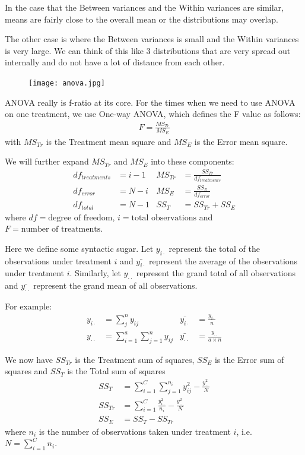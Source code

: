\documentclass[a4paper]{article}
\numberwithin{equation}{section}
\begin{document}
In the case that the Between variances and the Within variances are similar, means are fairly close to the overall mean or the distributions may overlap.

The other case is where the Between variances is small and the Within variances is very large.
We can think of this like 3 distributions that are very spread out internally and do not have a lot of distance from each other.
\begin{figure}[H]
  \centering
  \texttt{[image: anova.jpg]}
\end{figure}

ANOVA really is f-ratio at its core.
For the times when we need to use ANOVA on one treatment, we use One-way ANOVA, which defines the F value as follows:
\begin{align*}
  F = \frac{MS_{Tr}}{MS_{E}}
\end{align*}
with \(MS_{Tr}\) is the Treatment mean square and \(MS_{E}\) is the Error mean square.

We will further expand \(MS_{Tr}\) and \(MS_{E}\) into these components:
\begin{align*}
  df_{treatments} & = i - 1 & MS_{Tr} & = \frac{SS_{Tr}}{df_{treatments}} \\
  df_{error}      & = N - i & MS_{E}  & = \frac{SS_{E}}{df_{error}}       \\
  df_{total}      & = N - 1 & SS_{T}  & = SS_{Tr} + SS_{E}
\end{align*}
where \(df = \text{degree of freedom}\), \(i = \text{total observations}\) and \(F = \text{number of treatments}\).

Here we define some syntactic sugar. Let \(y_{i\cdot}\) represent the total of the observations under treatment \(i\) and \(\bar{y_{i\cdot}}\) represent the average of the observations under treatment \(i\).
Similarly, let \(y_{\cdot\cdot}\) represent the grand total of all observations and \(\bar{y_{\cdot\cdot}}\) represent the grand mean of all observations.

For example:
\begin{align*}
  y_{i\cdot}     & = \sum_{j}^{n} y_{ij}                  & \bar{y_{i\cdot}}     & = \frac{y_{i\cdot}}{n}              \\
  y_{\cdot\cdot} & = \sum_{i=1}^{a} \sum_{j=1}^{n} y_{ij} & \bar{y_{\cdot\cdot}} & = \frac{y_{\cdot\cdot}}{a \times n}
\end{align*}

We now have \(SS_{Tr}\) is the Treatment sum of squares, \(SS_{E}\) is the Error sum of squares and \(SS_{T}\) is the Total sum of squares
\begin{align*}
  SS_{T}  & = \sum_{i=1}^{C} \sum_{j=1}^{n_i} y_{ij}^2 - \frac{y_{\cdot\cdot}^2}{N}  \\
  SS_{Tr} & = \sum_{i=1}^{C} \frac{y_{i\cdot}^{2}}{n_i} - \frac{y_{\cdot\cdot}^2}{N} \\
  SS_{E}  & = SS_{T} - SS_{Tr}
\end{align*}
where \(n_i\) is the number of observations taken under treatment \(i\), i.e. \(N = \sum_{i=1}^{C} n_i\).
\end{document}
